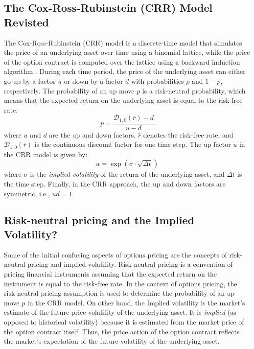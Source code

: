 \documentclass[11pt]{article}
\theoremstyle{definition}
\newcommand{\newterm}[1]{{\it #1}}
\begin{document}
\subsection{The Cox-Ross-Rubinstein (CRR) Model Revisted}
The Cox-Ross-Rubinstein (CRR) model is a discrete-time model that simulates the price of an underlying asset over time
using a binomial lattice, while the price of the option contract is computed over the lattice using a backward induction algorithm \cite{COX1979229}.
During each time period, the price of the underlying asset can either go up by a factor $u$ or down by a factor $d$ 
with probabilities $p$ and $1-p$, respectively. The probability of an up move $p$ is a risk-neutral probability, 
which means that the expected return on the underlying asset is equal to the risk-free rate:
\begin{equation*}
p = \frac{\mathcal{D}_{1,0}(\bar{r}) - d}{u - d}
\end{equation*}
where $u$ and $d$ are the up and down factors, $\bar{r}$ denotes the risk-free rate, and $\mathcal{D}_{1,0}(\bar{r})$ 
is the continuous discount factor for one time step. 
The up factor $u$ in the CRR model is given by:
\begin{equation*}
    u = \exp(\sigma\cdot\sqrt{\Delta{t}})
\end{equation*}
where $\sigma$ is the \newterm{implied volatility} of the return of the underlying asset, and $\Delta{t}$ is the time step. 
Finally, in the CRR approach, the up and down factors are symmetric, i.e., $ud=1$.


\subsection{Risk-neutral pricing and the Implied Volatility?}
Some of the initial confusing aspects of options pricing are the concepts of risk-neutral pricing and implied volatility.
Risk-neutral pricing is a convention of pricing financial instruments assuming that the expected return on the instrument is equal to the risk-free rate.
In the context of options pricing, the risk-neutral pricing assumption is used to determine the probability of an up move $p$ in the CRR model.
On other hand, the Implied volatility is the market's estimate of the future price volatility of the underlying asset.
It is \textit{implied} (as opposed to historical volatility) because it is estimated from the market price of the option contract itself.
Thus, the price action of the option contract reflects the market's expectation of the future volatility of the underlying asset.
\end{document}
